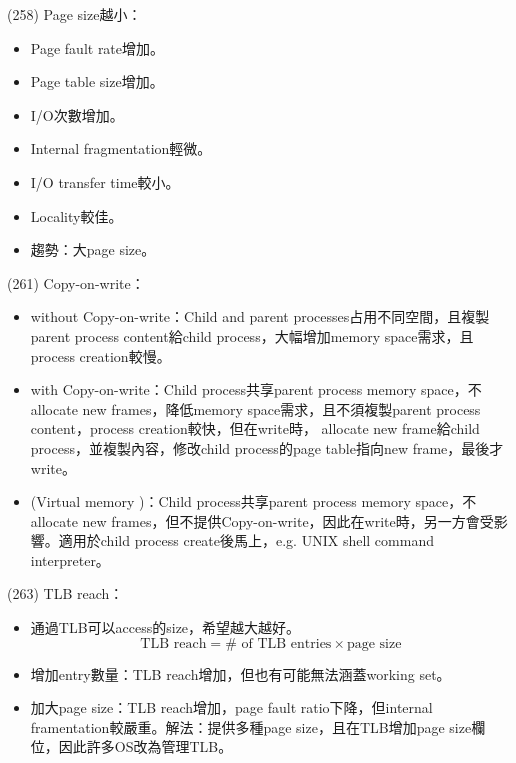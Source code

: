 \begin{theorem}{(258)} Page size越小：\begin{itemize}
        \item Page fault rate增加。
        \item Page table size增加。
        \item I/O次數增加。
        \item Internal fragmentation輕微。
        \item I/O transfer time較小。
        \item Locality較佳。
        \item 趨勢：大page size。
    \end{itemize} 
\end{theorem}

\begin{theorem}{(261)} Copy-on-write：\begin{itemize}
        \item {} without Copy-on-write：Child and parent processes占用不同空間，且複製parent process content給child process，大幅增加memory space需求，且process creation較慢。
        \item {} with Copy-on-write：Child process共享parent process memory space，不allocate new frames，降低memory space需求，且不須複製parent process content，process creation較快，但在write時，
        allocate new frame給child process，並複製內容，修改child process的page table指向new frame，最後才write。
        \item {} (Virtual memory )：Child process共享parent process memory space，不allocate new frames，但不提供Copy-on-write，因此在write時，另一方會受影響。適用於child process create後馬上，e.g. UNIX shell command interpreter。
    \end{itemize}
\end{theorem}

\begin{theorem}{(263)} TLB reach：\begin{itemize}
        \item 通過TLB可以access的size，希望越大越好。\begin{equation}
            \text{TLB reach} = \# \text{ of TLB entries} \times \text{page size}
        \end{equation}
        \item 增加entry數量：TLB reach增加，但也有可能無法涵蓋working set。
        \item 加大page size：TLB reach增加，page fault ratio下降，但internal framentation較嚴重。解法：提供多種page size，且在TLB增加page size欄位，因此許多OS改為管理TLB。
    \end{itemize}
\end{theorem}
